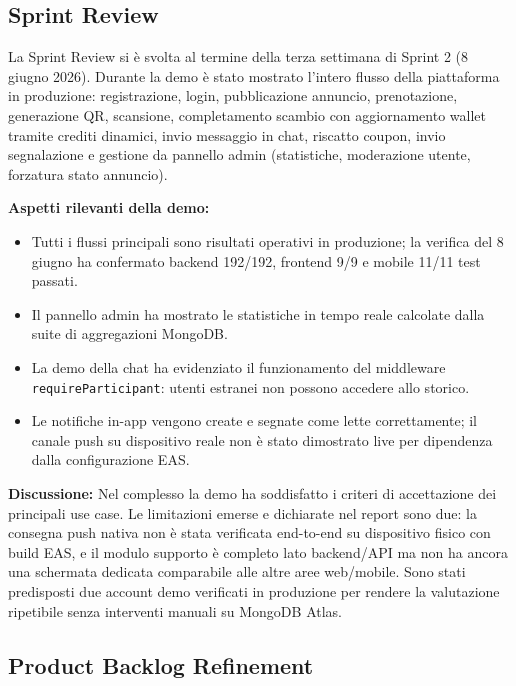 \documentclass[11pt,a4paper]{article}
\newcommand{\code}[1]{\texttt{#1}}
\begin{document}
\subsection{Sprint Review}

La Sprint Review si è svolta al termine della terza settimana di Sprint 2 (8 giugno 2026). Durante la demo è stato mostrato l'intero flusso della piattaforma in produzione: registrazione, login, pubblicazione annuncio, prenotazione, generazione QR, scansione, completamento scambio con aggiornamento wallet tramite crediti dinamici, invio messaggio in chat, riscatto coupon, invio segnalazione e gestione da pannello admin (statistiche, moderazione utente, forzatura stato annuncio).

\medskip
\noindent\textbf{Aspetti rilevanti della demo:}

\begin{itemize}[noitemsep]
  \item Tutti i flussi principali sono risultati operativi in produzione; la verifica del 8 giugno ha confermato backend 192/192, frontend 9/9 e mobile 11/11 test passati.
  \item Il pannello admin ha mostrato le statistiche in tempo reale calcolate dalla suite di aggregazioni MongoDB.
  \item La demo della chat ha evidenziato il funzionamento del middleware \code{requireParticipant}: utenti estranei non possono accedere allo storico.
  \item Le notifiche in-app vengono create e segnate come lette correttamente; il canale push su dispositivo reale non è stato dimostrato live per dipendenza dalla configurazione EAS.
\end{itemize}

\medskip
\noindent\textbf{Discussione:}
Nel complesso la demo ha soddisfatto i criteri di accettazione dei principali use case. Le limitazioni emerse e dichiarate nel report sono due: la consegna push nativa non è stata verificata end-to-end su dispositivo fisico con build EAS, e il modulo supporto è completo lato backend/API ma non ha ancora una schermata dedicata comparabile alle altre aree web/mobile. Sono stati predisposti due account demo verificati in produzione per rendere la valutazione ripetibile senza interventi manuali su MongoDB Atlas.

\subsection{Product Backlog Refinement}
\end{document}
